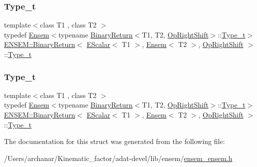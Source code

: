 \subsubsection{\texorpdfstring{Type\_t}{Type\_t}\hspace{0.1cm}{\footnotesize\ttfamily [2/3]}}
{\footnotesize\ttfamily template$<$class T1 , class T2 $>$ \\
typedef \mbox{\hyperlink{classENSEM_1_1Ensem}{Ensem}}$<$typename \mbox{\hyperlink{structENSEM_1_1BinaryReturn}{Binary\+Return}}$<$T1, T2, \mbox{\hyperlink{structENSEM_1_1OpRightShift}{Op\+Right\+Shift}}$>$\+::\mbox{\hyperlink{structENSEM_1_1BinaryReturn_3_01EScalar_3_01T1_01_4_00_01Ensem_3_01T2_01_4_00_01OpRightShift_01_4_ae17b6e4618444d5f927205f6af98d654}{Type\+\_\+t}}$>$ \mbox{\hyperlink{structENSEM_1_1BinaryReturn}{E\+N\+S\+E\+M\+::\+Binary\+Return}}$<$ \mbox{\hyperlink{classENSEM_1_1EScalar}{E\+Scalar}}$<$ T1 $>$, \mbox{\hyperlink{classENSEM_1_1Ensem}{Ensem}}$<$ T2 $>$, \mbox{\hyperlink{structENSEM_1_1OpRightShift}{Op\+Right\+Shift}} $>$\+::\mbox{\hyperlink{structENSEM_1_1BinaryReturn_3_01EScalar_3_01T1_01_4_00_01Ensem_3_01T2_01_4_00_01OpRightShift_01_4_ae17b6e4618444d5f927205f6af98d654}{Type\+\_\+t}}}

\mbox{\label{structENSEM_1_1BinaryReturn_3_01EScalar_3_01T1_01_4_00_01Ensem_3_01T2_01_4_00_01OpRightShift_01_4_ae17b6e4618444d5f927205f6af98d654}} 
\subsubsection{\texorpdfstring{Type\_t}{Type\_t}\hspace{0.1cm}{\footnotesize\ttfamily [3/3]}}
{\footnotesize\ttfamily template$<$class T1 , class T2 $>$ \\
typedef \mbox{\hyperlink{classENSEM_1_1Ensem}{Ensem}}$<$typename \mbox{\hyperlink{structENSEM_1_1BinaryReturn}{Binary\+Return}}$<$T1, T2, \mbox{\hyperlink{structENSEM_1_1OpRightShift}{Op\+Right\+Shift}}$>$\+::\mbox{\hyperlink{structENSEM_1_1BinaryReturn_3_01EScalar_3_01T1_01_4_00_01Ensem_3_01T2_01_4_00_01OpRightShift_01_4_ae17b6e4618444d5f927205f6af98d654}{Type\+\_\+t}}$>$ \mbox{\hyperlink{structENSEM_1_1BinaryReturn}{E\+N\+S\+E\+M\+::\+Binary\+Return}}$<$ \mbox{\hyperlink{classENSEM_1_1EScalar}{E\+Scalar}}$<$ T1 $>$, \mbox{\hyperlink{classENSEM_1_1Ensem}{Ensem}}$<$ T2 $>$, \mbox{\hyperlink{structENSEM_1_1OpRightShift}{Op\+Right\+Shift}} $>$\+::\mbox{\hyperlink{structENSEM_1_1BinaryReturn_3_01EScalar_3_01T1_01_4_00_01Ensem_3_01T2_01_4_00_01OpRightShift_01_4_ae17b6e4618444d5f927205f6af98d654}{Type\+\_\+t}}}



The documentation for this struct was generated from the following file\+:\begin{DoxyCompactItemize}
\item 
/\+Users/archanar/\+Kinematic\+\_\+factor/adat-\/devel/lib/ensem/\mbox{\hyperlink{adat-devel_2lib_2ensem_2ensem__ensem_8h}{ensem\+\_\+ensem.\+h}}\end{DoxyCompactItemize}
